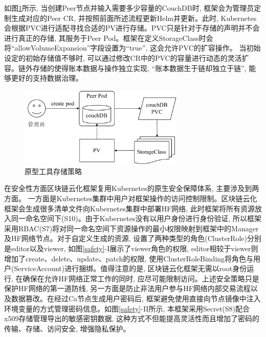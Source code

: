 如图\ref{pvc_sc}所示, 当创建Peer节点并输入需要多少容量的CouchDB时, 框架会为管理员定制生成对应的Peer CR, 并按照前面所述流程更新Helm并更新。此时, Kubernetes会根据PVC进行适配寻找合适的PV进行存储。PVC只是针对于存储的声明并不会进行真正的存储, 其服务于Peer Pod。框架在定义StorageClass时会将“allowVolumeExpansion”字段设置为“true”, 这会允许PVC的扩容操作。 当初始设定的初始存储值不够时, 可以通过修改CR中的PVC的容量进行动态的灵活扩容。链外存储的使得账本数据与操作独立实现, “账本数据生于链却独立于链”, 能够更好的支持数据治理。

\begin{figure}[h] %
    \centering %
    \includegraphics[width=0.7\textwidth]{FIGs/chapter4/pvc_sc.pdf} %
    \caption{原型工具存储策略} %
    \label{pvc_sc} %
\end{figure}%

在安全性方面区块链云化框架复用Kubernetes的原生安全保障体系, 主要涉及到两方面。 一方面是Kubernetes集群中用户对框架操作的访问控制限制。区块链云化框架会生成很多清单文件向Kubernetes集群中部署HF网络, 此时框架将所有资源放入同一命名空间下(S10)。由于Kubernetes没有以用户身份进行身份验证, 所以框架采用RBAC(S7)将对同一命名空间下资源操作的最小权限映射到框架中的Manager及HF网络节点。对于自定义生成的资源, 设置了两种类型的角色(ClusterRole)分别是editor以及viewer, 如图\ref{safety}-I展示了viewer角色的权限, editor相较于viewer则增加了create、delete、update、patch的权限, 使用ClusterRoleBinding将角色与用户(ServiceAccount)进行捆绑。值得注意的是, 区块链云化框架无需以root身份运行, 在确保在允许HF网络正常工作的同时, 应尽可能限制访问。上述安全策略只是保护HF网络的第一道防线, 另一方面是防止非法用户参与HF网络内部交易流程以及数据篡改。在经过Ca节点生成用户密码后, 框架避免使用直接向节点镜像中注入环境变量的方式管理密码信息。如图\ref{safety}-II所示, 本框架采用Secret(S8)配合x509\cite{8249485}存储管理导出的敏感密钥数据, 这种方式不但能提高灵活性而且增加了密码的传输、存储、访问安全, 增强隐私保护。

